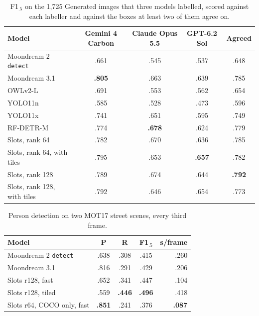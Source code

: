 \documentclass[10pt,twocolumn]{article}
\begin{document}
\begin{table}[h]
\centering\small\setlength{\tabcolsep}{7pt}
\caption{F1$_{.5}$ on the 1{,}725 Generated images that three models labelled, scored
against each labeller and against the boxes at least two of them agree on.}
\label{tab:labellers}
\begin{tabular}{@{}lcccc@{}}
\toprule
Model & Gemini 4 Carbon & Claude Opus 5.5 & GPT-6.2 Sol & Agreed \\
\midrule
Moondream 2 \texttt{detect} & .661 & .545 & .537 & .648 \\
Moondream 3.1 & \textbf{.805} & .663 & .639 & .785 \\
OWLv2-L & .691 & .553 & .562 & .654 \\
YOLO11n & .585 & .528 & .473 & .596 \\
YOLO11x & .741 & .651 & .595 & .749 \\
RF-DETR-M & .774 & \textbf{.678} & .624 & .779 \\
\rowcolor{rowtint} Slots, rank 64 & .782 & .670 & .636 & .785 \\
\rowcolor{rowtint} Slots, rank 64, with tiles & .795 & .653 & \textbf{.657} & .782 \\
\rowcolor{rowtint} Slots, rank 128 & .789 & .674 & .644 & \textbf{.792} \\
\rowcolor{rowtint} Slots, rank 128, with tiles & .792 & .646 & .654 & .773 \\
\bottomrule
\end{tabular}
\end{table}

\begin{table}[h]
\centering\small\setlength{\tabcolsep}{7pt}
\caption{Person detection on two MOT17 street scenes, every third frame.}
\label{tab:video}
\begin{tabular}{@{}lcccr@{}}
\toprule
Model & P & R & F1$_{.5}$ & s/frame \\
\midrule
Moondream 2 \texttt{detect} & .638 & .308 & .415 & .260 \\
Moondream 3.1 & .816 & .291 & .429 & .206 \\
\rowcolor{rowtint} Slots r128, fast & .652 & .341 & .447 & .104 \\
\rowcolor{rowtint} Slots r128, tiled & .559 & \textbf{.446} & \textbf{.496} & .418 \\
\rowcolor{rowtint} Slots r64, COCO only, fast & \textbf{.851} & .241 & .376 & \textbf{.087} \\
\bottomrule
\end{tabular}
\end{table}
\end{document}
